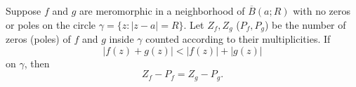 Suppose $f$ and $g$ are meromorphic in a neighborhood of $\overline{B}(a; R)$ with no zeros or poles on the circle $\gamma = \{z : |z - a| = R\}$. Let $Z_f, Z_g$ ($P_f, P_g$) be the number of zeros (poles) of $f$ and $g$ inside $\gamma$ counted according to their multiplicities. If
$$
|f(z) + g(z)| < |f(z)| + |g(z)|
$$
on $\gamma$, then
$$
Z_f - P_f = Z_g - P_g.
$$

